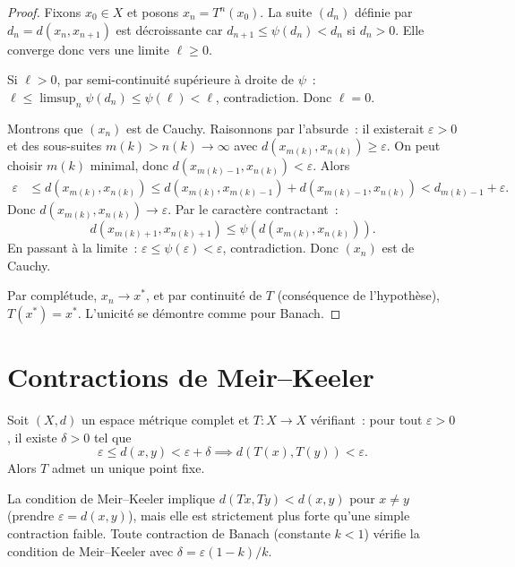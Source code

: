 \begin{proof}
Fixons $x_0 \in X$ et posons $x_n = T^n(x_0)$. La suite $(d_n)$ d\'efinie par
$d_n = d(x_n, x_{n+1})$ est d\'ecroissante car $d_{n+1} \leq \psi(d_n) < d_n$
si $d_n > 0$. Elle converge donc vers une limite $\ell \geq 0$.

Si $\ell > 0$, par semi-continuit\'e sup\'erieure \`a droite de $\psi$~:
$\ell \leq \limsup_{n} \psi(d_n) \leq \psi(\ell) < \ell$, contradiction. Donc
$\ell = 0$.

Montrons que $(x_n)$ est de Cauchy. Raisonnons par l'absurde~: il existerait
$\varepsilon > 0$ et des sous-suites $m(k) > n(k) \to \infty$ avec
$d(x_{m(k)}, x_{n(k)}) \geq \varepsilon$. On peut choisir $m(k)$ minimal,
donc $d(x_{m(k)-1}, x_{n(k)}) < \varepsilon$. Alors
\begin{align*}
    \varepsilon &\leq d(x_{m(k)}, x_{n(k)})
    \leq d(x_{m(k)}, x_{m(k)-1}) + d(x_{m(k)-1}, x_{n(k)})
    < d_{m(k)-1} + \varepsilon.
\end{align*}
Donc $d(x_{m(k)}, x_{n(k)}) \to \varepsilon$. Par le caract\`ere contractant~:
\[
    d(x_{m(k)+1}, x_{n(k)+1}) \leq \psi(d(x_{m(k)}, x_{n(k)})).
\]
En passant \`a la limite~: $\varepsilon \leq \psi(\varepsilon) < \varepsilon$,
contradiction. Donc $(x_n)$ est de Cauchy.

Par compl\'etude, $x_n \to x^*$, et par continuit\'e de $T$ (cons\'equence de
l'hypoth\`ese), $T(x^*) = x^*$. L'unicit\'e se d\'emontre comme pour Banach.
\end{proof}

\section{Contractions de Meir--Keeler}

\begin{theoreme}
Soit $(X, d)$ un espace m\'etrique complet et $T : X \to X$ v\'erifiant~:
pour tout $\varepsilon > 0$, il existe $\delta > 0$ tel que
\[
    \varepsilon \leq d(x, y) < \varepsilon + \delta \implies d(T(x), T(y)) < \varepsilon.
\]
Alors $T$ admet un unique point fixe.
\end{theoreme}

\begin{remarque}
La condition de Meir--Keeler implique $d(Tx, Ty) < d(x,y)$ pour $x \neq y$
(prendre $\varepsilon = d(x,y)$), mais elle est strictement plus forte qu'une
simple contraction faible. Toute contraction de Banach (constante $k < 1$)
v\'erifie la condition de Meir--Keeler avec $\delta = \varepsilon(1-k)/k$.
\end{remarque}

